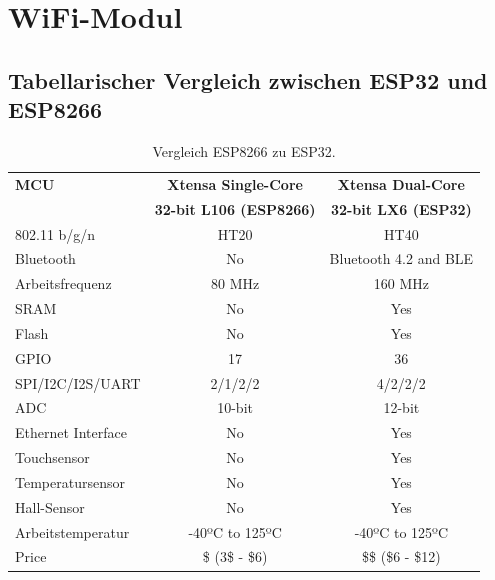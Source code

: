 \section{WiFi-Modul}\label{Appendix:ESP_32}

\subsection{Tabellarischer Vergleich zwischen ESP32 und ESP8266}\label{Appendix:ESP32_vs_ESP8266}

\begin{table}[H]
\center
\begin{tabular}{|l|c|c|}
\hline
\textbf{MCU}                    & \textbf{Xtensa Single-Core} & \textbf{Xtensa Dual-Core} \\

			                   & \textbf{32-bit L106 (ESP8266)} & \textbf{32-bit LX6 (ESP32)} \\ \hline

802.11 b/g/n     		& HT20                           & HT40                                       \\
Bluetooth              	& No                             & Bluetooth 4.2 and BLE                      \\
Arbeitsfrequenz			& 80 MHz                         & 160 MHz                                    \\
SRAM                   	& No                             & Yes                                         \\
Flash                  	& No                             & Yes                                          \\
GPIO                   	& 17                             & 36                                         \\
SPI/I2C/I2S/UART       	& 2/1/2/2                        & 4/2/2/2                                    \\
ADC                    	& 10-bit                         & 12-bit                                     \\
Ethernet Interface 		& No                             & Yes                                          \\
Touchsensor           	& No                             & Yes                                          \\
Temperatursensor     	& No                             & Yes                                          \\
Hall-Sensor     			& No                             & Yes \\
Arbeitstemperatur    	& -40ºC to 125ºC                 & -40ºC to 125ºC                             \\
Price                  	& \$ (3\$ - \$6)                 & \$\$ (\$6 - \$12)    \\                         
\hline
\end{tabular}
\caption{Vergleich ESP8266 zu ESP32. \cite{iainandrew_esp8266_2018}}
\label{tab:ESP}
\end{table}

